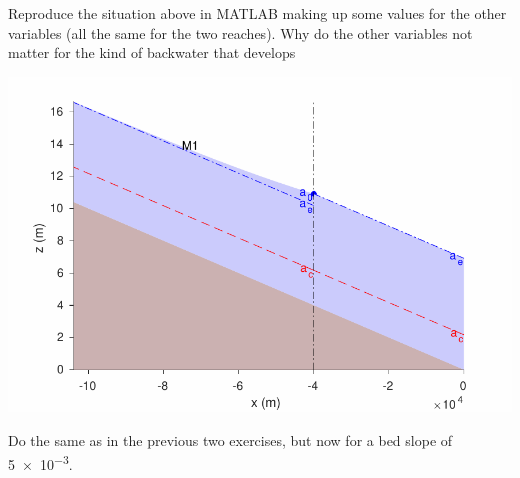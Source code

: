 \documentclass[a4paper]{article}
\begin{document}
\begin{exercise}
  Reproduce the situation above in MATLAB making up some values for the other variables (all the same for the two reaches). Why do the other variables not matter for the kind of backwater that develops
\end{exercise}

\begin{solution}
    
    \includegraphics[width=\linewidth]{matlab/riv_eng_1.pdf}
\end{solution}


\begin{exercise}
  Do the same as in the previous two exercises, but now for a bed slope of \num{5e-3}.
\end{exercise}
\end{document}
